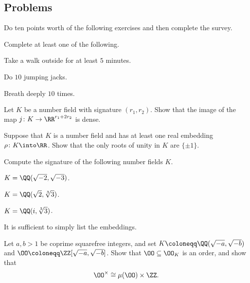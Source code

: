 \documentclass[../notes.tex]{subfiles}
\begin{document}
\subsection{Problems}
Do ten points worth of the following exercises and then complete the survey.
\begin{prob}[1 point]
	Complete at least one of the following.
	\begin{listalph}
		\item Take a walk outside for at least $5$ minutes.
		\item Do $10$ jumping jacks.
		\item Breath deeply $10$ times.
	\end{listalph}
\end{prob}
\begin{prob}[2 points]
	Let $K$ be a number field with signature $(r_1,r_2)$. Show that the image of the map $j\colon K\to\RR^{r_1+2r_2}$ is dense.
\end{prob}
\begin{prob}[2 points]
	Suppose that $K$ is a number field and has at least one real embedding $\rho\colon K\into\RR$. Show that the only roots of unity in $K$ are $\{\pm1\}$.
\end{prob}
\begin{prob}[3 points]
	Compute the signature of the following number fields $K$.
	\begin{listalph}
		\item $K=\QQ(\sqrt{-2},\sqrt{-3})$.
		\item $K=\QQ(\sqrt2,\sqrt[3]3)$.
		\item $K=\QQ(i,\sqrt[3]3)$.
	\end{listalph}
	It is sufficient to simply list the embeddings.
\end{prob}
\begin{prob}[3 points]
	Let $a,b>1$ be coprime squarefree integers, and set $K\coloneqq\QQ(\sqrt{-a},\sqrt{-b})$ and $\OO\coloneqq\ZZ[\sqrt{-a},\sqrt{-b}]$. Show that $\OO\subseteq\OO_K$ is an order, and show that
	\[\OO^\times\cong\mu(\OO)\times\ZZ.\]
\end{prob}
\end{document}
